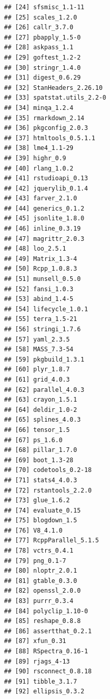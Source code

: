 \documentclass[
]{book}
\begin{document}
\begin{verbatim}
## [24] sfsmisc_1.1-11       
## [25] scales_1.2.0         
## [26] callr_3.7.0          
## [27] pbapply_1.5-0        
## [28] askpass_1.1          
## [29] goftest_1.2-2        
## [30] stringr_1.4.0        
## [31] digest_0.6.29        
## [32] StanHeaders_2.26.10  
## [33] spatstat.utils_2.2-0 
## [34] minqa_1.2.4          
## [35] rmarkdown_2.14       
## [36] pkgconfig_2.0.3      
## [37] htmltools_0.5.1.1    
## [38] lme4_1.1-29          
## [39] highr_0.9            
## [40] rlang_1.0.2          
## [41] rstudioapi_0.13      
## [42] jquerylib_0.1.4      
## [43] farver_2.1.0         
## [44] generics_0.1.2       
## [45] jsonlite_1.8.0       
## [46] inline_0.3.19        
## [47] magrittr_2.0.3       
## [48] loo_2.5.1            
## [49] Matrix_1.3-4         
## [50] Rcpp_1.0.8.3         
## [51] munsell_0.5.0        
## [52] fansi_1.0.3          
## [53] abind_1.4-5          
## [54] lifecycle_1.0.1      
## [55] terra_1.5-21         
## [56] stringi_1.7.6        
## [57] yaml_2.3.5           
## [58] MASS_7.3-54          
## [59] pkgbuild_1.3.1       
## [60] plyr_1.8.7           
## [61] grid_4.0.3           
## [62] parallel_4.0.3       
## [63] crayon_1.5.1         
## [64] deldir_1.0-2         
## [65] splines_4.0.3        
## [66] tensor_1.5           
## [67] ps_1.6.0             
## [68] pillar_1.7.0         
## [69] boot_1.3-28          
## [70] codetools_0.2-18     
## [71] stats4_4.0.3         
## [72] rstantools_2.2.0     
## [73] glue_1.6.2           
## [74] evaluate_0.15        
## [75] blogdown_1.5         
## [76] V8_4.1.0             
## [77] RcppParallel_5.1.5   
## [78] vctrs_0.4.1          
## [79] png_0.1-7            
## [80] nloptr_2.0.1         
## [81] gtable_0.3.0         
## [82] openssl_2.0.0        
## [83] purrr_0.3.4          
## [84] polyclip_1.10-0      
## [85] reshape_0.8.8        
## [86] assertthat_0.2.1     
## [87] xfun_0.31            
## [88] RSpectra_0.16-1      
## [89] rjags_4-13           
## [90] rsconnect_0.8.18     
## [91] tibble_3.1.7         
## [92] ellipsis_0.3.2
\end{verbatim}

  
\end{document}

